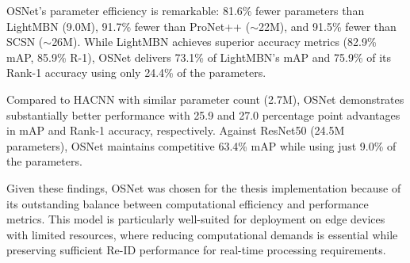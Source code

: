 OSNet's parameter efficiency is remarkable: 81.6\% fewer parameters than LightMBN (9.0M), 91.7\% fewer than ProNet++ ($\sim$22M), and 91.5\% fewer than SCSN ($\sim$26M). While LightMBN achieves superior accuracy metrics (82.9\% mAP, 85.9\% R-1), OSNet delivers 73.1\% of LightMBN's mAP and 75.9\% of its Rank-1 accuracy using only 24.4\% of the parameters.

Compared to HACNN with similar parameter count (2.7M), OSNet demonstrates substantially better performance with 25.9 and 27.0 percentage point advantages in mAP and Rank-1 accuracy, respectively. Against ResNet50 (24.5M parameters), OSNet maintains competitive 63.4\% mAP while using just 9.0\% of the parameters.

Given these findings, OSNet was chosen for the thesis implementation because of its outstanding balance between computational efficiency and performance metrics. This model is particularly well-suited for deployment on edge devices with limited resources, where reducing computational demands is essential while preserving sufficient Re-ID performance for real-time processing requirements.